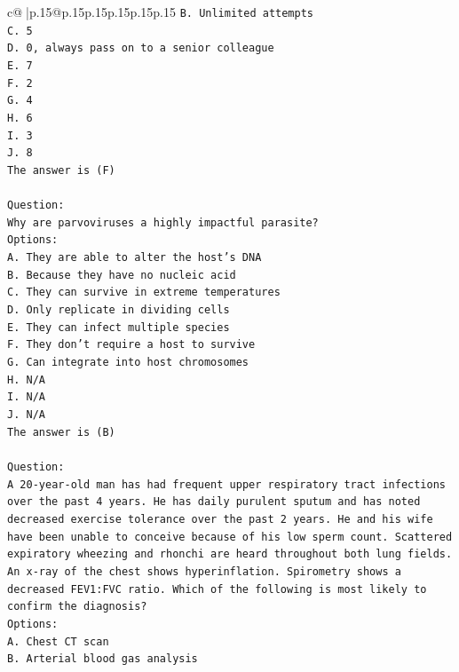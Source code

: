 \documentclass{article}
\begin{document}
{\begin{supertabular}{c@{$\;$}|p{.15\linewidth}@{}p{.15\linewidth}p{.15\linewidth}p{.15\linewidth}p{.15\linewidth}p{.15\linewidth}}
{{{\texttt{B. Unlimited attempts} \\
\texttt{C. 5} \\
\texttt{D. 0, always pass on to a senior colleague} \\
\texttt{E. 7} \\
\texttt{F. 2} \\
\texttt{G. 4} \\
\texttt{H. 6} \\
\texttt{I. 3} \\
\texttt{J. 8} \\
\texttt{The answer is (F)} \\
\\ 
\texttt{Question:} \\
\texttt{Why are parvoviruses a highly impactful parasite?} \\
\texttt{Options:} \\
\texttt{A. They are able to alter the host's DNA} \\
\texttt{B. Because they have no nucleic acid} \\
\texttt{C. They can survive in extreme temperatures} \\
\texttt{D. Only replicate in dividing cells} \\
\texttt{E. They can infect multiple species} \\
\texttt{F. They don't require a host to survive} \\
\texttt{G. Can integrate into host chromosomes} \\
\texttt{H. N/A} \\
\texttt{I. N/A} \\
\texttt{J. N/A} \\
\texttt{The answer is (B)} \\
\\ 
\texttt{Question:} \\
\texttt{A 20{-}year{-}old man has had frequent upper respiratory tract infections over the past 4 years. He has daily purulent sputum and has noted decreased exercise tolerance over the past 2 years. He and his wife have been unable to conceive because of his low sperm count. Scattered expiratory wheezing and rhonchi are heard throughout both lung fields. An x{-}ray of the chest shows hyperinflation. Spirometry shows a decreased FEV1:FVC ratio. Which of the following is most likely to confirm the diagnosis? } \\
\texttt{Options:} \\
\texttt{A. Chest CT scan} \\
\texttt{B. Arterial blood gas analysis} \\
}}}
\end{supertabular}}
\end{document}
